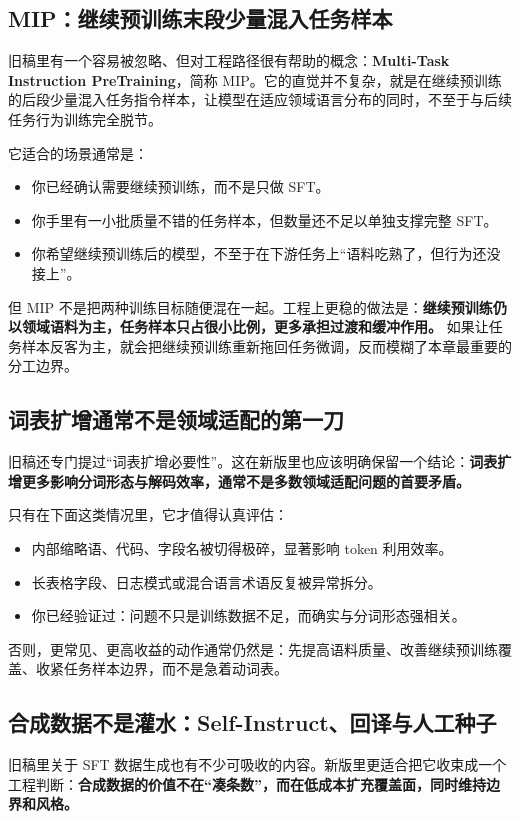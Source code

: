 \subsection{MIP：继续预训练末段少量混入任务样本}
旧稿里有一个容易被忽略、但对工程路径很有帮助的概念：\textbf{Multi-Task Instruction PreTraining}，简称 MIP。它的直觉并不复杂，就是在继续预训练的后段少量混入任务指令样本，让模型在适应领域语言分布的同时，不至于与后续任务行为训练完全脱节。

它适合的场景通常是：
\begin{itemize}
  \item 你已经确认需要继续预训练，而不是只做 SFT。
  \item 你手里有一小批质量不错的任务样本，但数量还不足以单独支撑完整 SFT。
  \item 你希望继续预训练后的模型，不至于在下游任务上“语料吃熟了，但行为还没接上”。
\end{itemize}

但 MIP 不是把两种训练目标随便混在一起。工程上更稳的做法是：\textbf{继续预训练仍以领域语料为主，任务样本只占很小比例，更多承担过渡和缓冲作用。} 如果让任务样本反客为主，就会把继续预训练重新拖回任务微调，反而模糊了本章最重要的分工边界。

\subsection{词表扩增通常不是领域适配的第一刀}
旧稿还专门提过“词表扩增必要性”。这在新版里也应该明确保留一个结论：\textbf{词表扩增更多影响分词形态与解码效率，通常不是多数领域适配问题的首要矛盾。}

只有在下面这类情况里，它才值得认真评估：
\begin{itemize}
  \item 内部缩略语、代码、字段名被切得极碎，显著影响 token 利用效率。
  \item 长表格字段、日志模式或混合语言术语反复被异常拆分。
  \item 你已经验证过：问题不只是训练数据不足，而确实与分词形态强相关。
\end{itemize}

否则，更常见、更高收益的动作通常仍然是：先提高语料质量、改善继续预训练覆盖、收紧任务样本边界，而不是急着动词表。

\subsection{合成数据不是灌水：Self-Instruct、回译与人工种子}
旧稿里关于 SFT 数据生成也有不少可吸收的内容。新版里更适合把它收束成一个工程判断：\textbf{合成数据的价值不在“凑条数”，而在低成本扩充覆盖面，同时维持边界和风格。}

